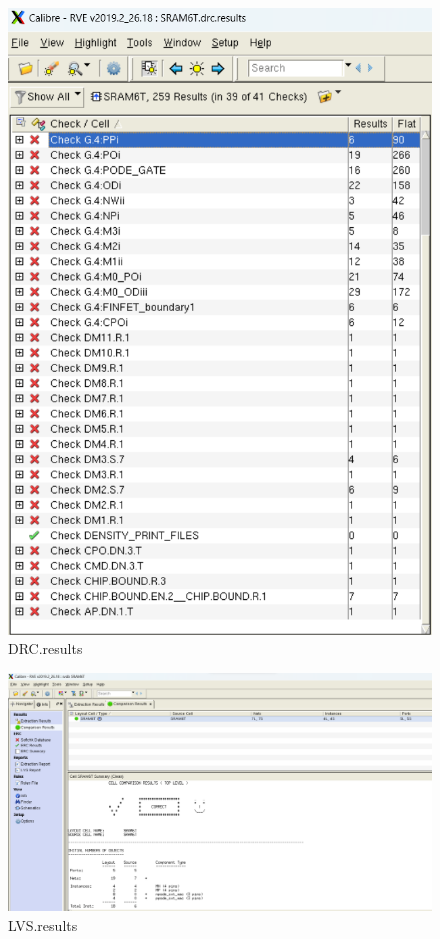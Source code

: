 \documentclass{article}
\begin{document}
\begin{figure}[H]
\begin{minipage}[t]{0.45\textwidth}
    \includegraphics[width=\linewidth]{./img/2024-01-05-15-01-54.png}
\caption{DRC.results}
\label{db10}
\end{minipage}
\end{figure}

\begin{figure}[H]
  \centering
  \includegraphics[width=0.9\linewidth]{./img/2024-01-05-15-00-11.png}
  \caption{LVS.results}
  \end{figure}
\end{document}
